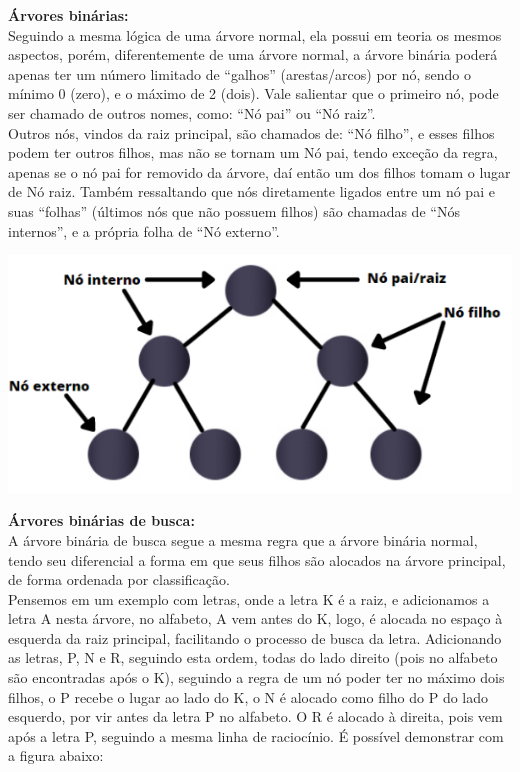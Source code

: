 \documentclass[11pt]{article} %
\begin{document}
\begin{enumerate}[a)]
		{\bf Árvores binárias:} \\
		\hspace*{1cm}Seguindo a mesma lógica de uma árvore normal, ela possui em teoria os mesmos aspectos, porém, diferentemente de uma árvore normal, a árvore binária poderá apenas ter um número limitado de “galhos” (arestas/arcos) por nó, sendo o mínimo 0 (zero), e o máximo de 2 (dois). Vale salientar que o primeiro nó, pode ser chamado de outros nomes, como: “Nó pai” ou “Nó raiz”.\\ \hspace*{1cm} Outros nós, vindos da raiz principal, são chamados de: “Nó filho”, e esses filhos podem ter outros filhos, mas não se tornam um Nó pai, tendo exceção da regra, apenas se o nó pai for removido da árvore, daí então um dos filhos tomam o lugar de Nó raiz. Também ressaltando que nós diretamente ligados entre um nó pai e suas “folhas” (últimos nós que não possuem filhos) são chamadas de “Nós internos”, e a própria folha de “Nó externo”.
	
		\begin{center}
			\includegraphics[scale = 0.7]{q1a1.png}
		\end{center}
	
	{\bf Árvores binárias de busca:} \\
	\hspace*{1cm} A árvore binária de busca segue a mesma regra que a árvore binária normal, tendo seu diferencial a forma em que seus filhos são alocados na árvore principal, de forma ordenada por classificação. \\
	\hspace*{1cm}Pensemos em um exemplo com letras, onde a letra K é a raiz, e adicionamos a letra A nesta árvore, no alfabeto, A vem antes do K, logo, é alocada no espaço à esquerda da raiz principal, facilitando o processo de busca da letra. Adicionando as letras, P, N e R, seguindo esta ordem, todas do lado direito (pois no alfabeto são encontradas após o K), seguindo a regra de um nó poder ter no máximo dois filhos, o P recebe o lugar ao lado do K, o N é alocado como filho do P do lado esquerdo, por vir antes da letra P no alfabeto. O R é alocado à direita, pois vem após a letra P, seguindo a mesma linha de raciocínio. 
	É possível demonstrar com a figura abaixo:
	

\end{enumerate}
\end{document}
